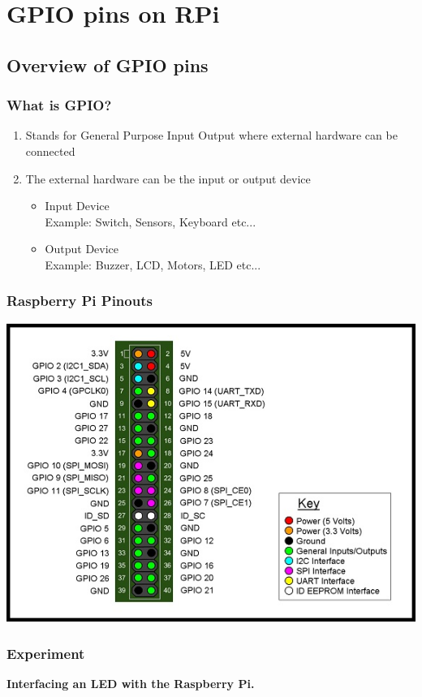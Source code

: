 \documentclass[10pt,red]{beamer}
\title
[
	Raspberry Pi Hardware Development	%
	\hspace{0.5cm}
	\insertframenumber/\inserttotalframenumber
]
{
	Accessing GPIO pins on Raspberry Pi
}
\author
[
	www.e-yantra.org
]
{
	e-Yantra Team \\
  Embedded Real-Time Systems Lab\\
  Indian Institute of Technology-Bombay \\
}
\date
{
IIT Bombay \\ {\today}
}
\begin{document}
 

\begin{frame}
	\titlepage
\end{frame} 

\section{GPIO pins on RPi}
\subsection{Overview of GPIO pins}
\begin{frame}
	\frametitle{What is GPIO?} \pause
		\begin{enumerate}
			\item<+-|alert@+> Stands for General Purpose Input Output where external hardware can be connected \\[10pt]
			\item<+-|alert@+> The external hardware can be the input or output device  \\[10pt]
				\begin{itemize}
				\item<+-|alert@+> Input Device  \\[10pt]
				 Example: Switch, Sensors, Keyboard etc...\\[10pt]
				 \item<+-|alert@+> Output Device  \\[10pt]
				 Example: Buzzer, LCD, Motors, LED etc...    
				\end{itemize}
		\end{enumerate}
\end{frame}

\begin{frame}
	\frametitle{Raspberry Pi Pinouts} \pause
	\centering
	\includegraphics[scale= 0.4]{rpi_pinout.jpg}
\end{frame}
\begin{frame}
	\frametitle{Experiment} \pause
	\textbf{Interfacing an LED with the Raspberry Pi.}
\end{frame}
\end{document}
